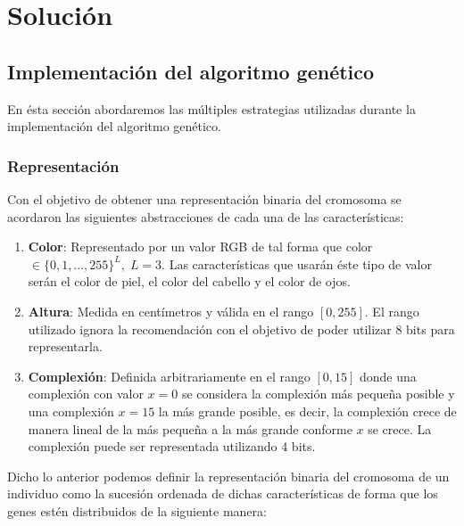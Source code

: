 \documentclass[10pt,letterpaper]{article}
\begin{document}
\section{Solución}

\subsection{Implementación del algoritmo genético}
En ésta sección abordaremos las múltiples estrategias utilizadas durante la implementación
del algoritmo genético.

\subsubsection{Representación}

Con el objetivo de obtener una representación binaria del cromosoma se acordaron las siguientes
abstracciones de cada una de las características:

\begin{enumerate}
    \item \textbf{Color}: Representado por un valor RGB de tal forma que
          color $ \in \{0, 1,...,255\}^L, \; L=3$. Las características que usarán éste
          tipo de valor serán el color de piel, el color del cabello y el color de ojos.
    \item \textbf{Altura}: Medida en centímetros y válida en el rango $[0, 255]$. El rango
          utilizado ignora la recomendación con el objetivo de poder utilizar 8 bits para
          representarla.
    \item \textbf{Complexión}: Definida arbitrariamente en el rango $[0, 15]$ donde una
          complexión con valor $x=0$ se considera la complexión más pequeña posible y
          una complexión $x=15$ la más grande posible, es decir, la complexión crece de
          manera lineal de la más pequeña a la más grande conforme $x$ se crece. La
          complexión puede ser representada utilizando 4 bits.
\end{enumerate}

Dicho lo anterior podemos definir la representación binaria del cromosoma de un individuo
como la sucesión ordenada de dichas características de forma que los genes estén distribuidos
de la siguiente manera: \\
\end{document}
